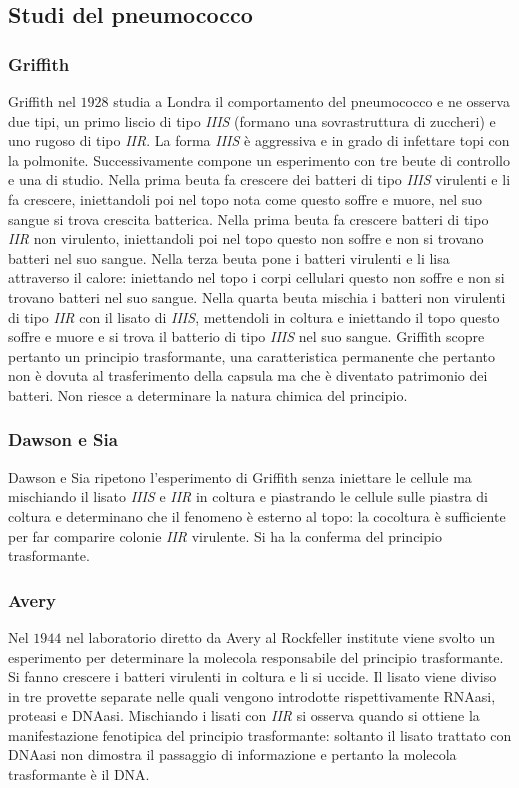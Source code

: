 	\subsection{Studi del pneumococco}

		\subsubsection{Griffith}
		Griffith nel $1928$ studia a Londra il comportamento del pneumococco e ne osserva due tipi, un primo liscio di tipo \emph{IIIS} (formano una sovrastruttura di zuccheri) e uno rugoso di tipo \emph{IIR}. 
		La forma \emph{IIIS} \`e aggressiva e in grado di infettare topi con la polmonite. 
		Successivamente compone un esperimento con tre beute di controllo e una di studio. 
		Nella prima beuta fa crescere dei batteri di tipo \emph{IIIS} virulenti e li fa crescere, iniettandoli poi nel topo nota come questo soffre e muore, nel suo sangue si trova crescita batterica. 
		Nella prima beuta fa crescere batteri di tipo \emph{IIR} non virulento, iniettandoli poi nel topo questo non soffre e non si trovano batteri nel suo sangue. 
		Nella terza beuta pone i batteri virulenti e li lisa attraverso il calore: iniettando nel topo i corpi cellulari questo non soffre e non si trovano batteri nel suo sangue. 
		Nella quarta beuta mischia i batteri non virulenti di  tipo \emph{IIR} con il lisato di \emph{IIIS}, mettendoli in coltura e iniettando il topo questo soffre e muore e si trova il batterio di tipo \emph{IIIS} nel suo sangue. 
		Griffith scopre pertanto un principio trasformante, una caratteristica permanente che pertanto non \`e dovuta al trasferimento della capsula ma che \`e diventato patrimonio dei batteri. 
		Non riesce a determinare la natura chimica del principio.

		\subsubsection{Dawson e Sia}
		Dawson e Sia ripetono l'esperimento di Griffith senza iniettare le cellule ma mischiando il lisato \emph{IIIS} e \emph{IIR} in coltura e piastrando le cellule sulle piastra di coltura e determinano che il fenomeno \`e esterno al topo: la cocoltura \`e sufficiente per far comparire colonie \emph{IIR} virulente. 
		Si ha la conferma del principio trasformante. 

		\subsubsection{Avery}
		Nel $1944$ nel laboratorio diretto da Avery al Rockfeller institute viene svolto un esperimento per determinare la molecola responsabile del principio trasformante. 
		Si fanno crescere i batteri virulenti in coltura e li si uccide. 
		Il lisato viene diviso in tre provette separate nelle quali vengono introdotte rispettivamente RNAasi, proteasi e DNAasi. 
		Mischiando i lisati con \emph{IIR} si osserva quando si ottiene la manifestazione fenotipica del principio trasformante: soltanto il lisato trattato con DNAasi non dimostra il passaggio di informazione e pertanto la molecola trasformante \`e il DNA. 

